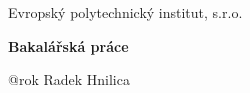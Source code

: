 Evropský polytechnický institut, s.r.o.

\medskip
\vfill

{\bf\Large Bakalářská práce}

\vfill

{@rok \hfill \LARGE Radek Hnilica}
